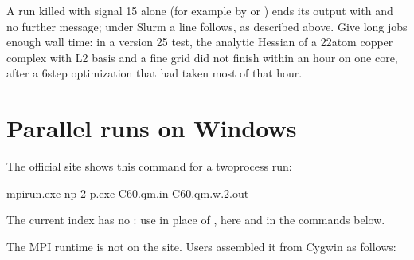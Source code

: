 \documentclass[letterpaper,10pt,english,openany,oneside]{sphinxmanual}
\begin{document}
\sphinxAtStartPar
A run killed with signal 15 alone (for example by  or ) ends its output with
 and no further message; under Slurm a  line follows, as described
above. Give long jobs enough wall time: in a version 25 test, the analytic Hessian of a 22\sphinxhyphen{}atom copper complex with L2 basis and a fine grid did not finish within an hour on one
core, after a 6\sphinxhyphen{}step optimization that had taken most of that hour.




\section{Parallel runs on Windows}
\label{\detokenize{start/parallel:parallel-runs-on-windows}}\label{\detokenize{start/parallel:running-windows-parallel}}
\sphinxAtStartPar
The official site shows this command for a two\sphinxhyphen{}process run:

\begin{sphinxVerbatim}[commandchars=\\\{\}]
mpirun.exe \PYGZhy{}np 2 p.exe C60.qm.in C60.qm.w.2.out
\end{sphinxVerbatim}

\sphinxAtStartPar
The current index has no : use  in place of , here and in the commands below.

\sphinxAtStartPar
The MPI runtime is not on the site. Users assembled it from Cygwin as follows:
\end{document}
